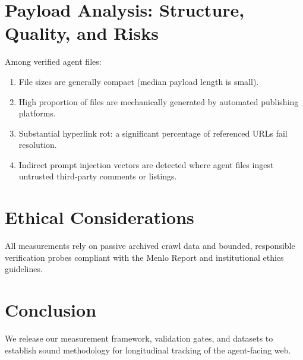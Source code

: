 \documentclass[sigconf,anonymous,review]{acmart}
\begin{document}
\section{Payload Analysis: Structure, Quality, and Risks}
Among verified agent files:
\begin{enumerate}
    \item File sizes are generally compact (median payload length is small).
    \item High proportion of files are mechanically generated by automated publishing platforms.
    \item Substantial hyperlink rot: a significant percentage of referenced URLs fail resolution.
    \item Indirect prompt injection vectors are detected where agent files ingest untrusted third-party comments or listings.
\end{enumerate}

\section{Ethical Considerations}
All measurements rely on passive archived crawl data and bounded, responsible verification probes compliant with the Menlo Report and institutional ethics guidelines.

\section{Conclusion}
We release our measurement framework, validation gates, and datasets to establish sound methodology for longitudinal tracking of the agent-facing web.



\end{document}

